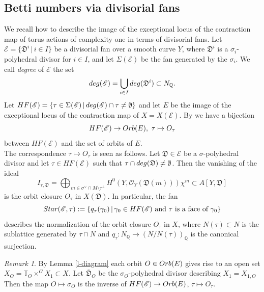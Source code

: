 \documentclass[11pt, reqno]{amsart}
\theoremstyle{plain}
\theoremstyle{definition}
\theoremstyle{remark}
\newtheorem{remark}[theorem]{Remark}
\begin{document}
\subsection{Betti numbers via divisorial fans}\label{Beettidivfanop}
We recall how to describe the image of the exceptional locus of the contraction map of torus actions of 
complexity one in terms of divisorial fans. Let  $\mathscr{E} =  \{\mathfrak{D}^{i}\, |\, i\in I\}$ be a divisorial fan over a smooth curve $Y$, where $\mathfrak{D}^{i}$ is a  $\sigma_{i}$-polyhedral divisor for $i\in I$, and let $\Sigma(\mathscr{E})$ be the fan
generated by the $\sigma_{i}$. We call \emph{degree} of $\mathscr{E}$ the set
$${\rm deg}(\mathscr{E}) =  \bigcup_{i\in I} {\rm deg}(\mathfrak{D}^{i})\subset N_{\mathbb{Q}}.$$
Let $HF(\mathscr{E}) =  \{\tau\in \Sigma(\mathscr{E})\,|\, {\rm deg}(\mathscr{E}) \cap \tau\neq \emptyset\}$ and let $E$ be the image of the exceptional locus of the contraction 
map of $X =  X(\mathscr{E})$. By \cite[Sections 3 and 4]{Tim97}
we have a bijection 
$$HF(\mathscr{E})\rightarrow {\rm Orb}(E),\,\, \tau\mapsto O_{\tau}$$
between $HF(\mathscr{E})$ and the set of orbits of $E$. 
\\

The correspondence $\tau\mapsto O_{\tau}$ is seen as follows. 
Let $\mathfrak{D}\in \mathscr{E}$ be a $\sigma$-polyhedral divisor and let $\tau\in HF(\mathscr{E})$ such that $\tau\cap {\rm deg}(\mathfrak{D})\neq \emptyset$. Then the vanishing of the  ideal 
$$I_{\tau, \mathfrak{D}}= \bigoplus_{m\in \sigma^{\vee}\cap M\setminus \tau^{\perp}}H^{0}(Y, \mathcal{O}_{Y}(\mathfrak{D}(m)))\chi^{m}\subset A[Y, \mathfrak{D}]$$
is  the orbit closure $O_{\tau}$ in $X(\mathfrak{D})$. In particular, the fan
$${\rm Star}(\mathscr{E}, \tau):= \{q_{\tau}(\gamma_{0})\,|\, \gamma_{0}\in HF(\mathscr{E})\text{ and }\tau\text{ is a face of }\gamma_{0}\}$$
describes the normalization of the orbit closure $O_{\tau}$ in $X$, where $N(\tau)\subset N$ is the sublattice generated by $\tau\cap N$ and $q_{\tau}: N_{\mathbb{Q}}\rightarrow (N/N(\tau))_{\mathbb{Q}}$ is the canonical surjection.   
\begin{remark}\label{remark-SigmaO1s}
By Lemma \ref{l-diagram} each orbit $O\in{\rm Orb}(E)$ gives rise to an open
set $X_{O} =  \mathbb{T}_{O}\times^{G}X_{1}\subset X$.
Let $\bar{\mathfrak{D}}_{O}$ be the $\sigma_{O}$-polyhedral divisor describing $X_{1} = X_{1, O}$
Then the map $O\mapsto \sigma_{O}$ is the inverse of $HF(\mathscr{E})\rightarrow {\rm Orb}(E)$, $\tau\mapsto O_{\tau}$. 
\end{remark}
\end{document}
